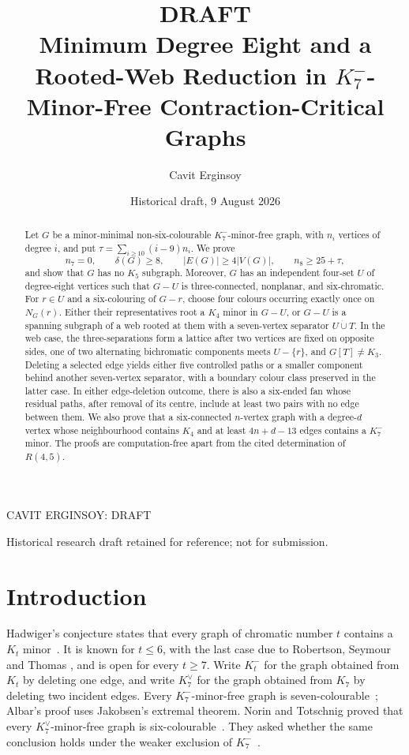 \documentclass[11pt]{amsart}
\title[DRAFT: Minimum Degree Eight and a Rooted-Web Reduction]
{\textbf{DRAFT}\\[0.5ex]
Minimum Degree Eight and a Rooted-Web Reduction in
$K_7^{-}$-Minor-Free Contraction-Critical Graphs}
\author{Cavit Erginsoy}
\date{Historical draft, 9 August 2026}
\begin{document}
\begin{abstract}
Let $G$ be a minor-minimal non-six-colourable $K_7^{-}$-minor-free graph,
with $n_i$ vertices of degree $i$, and put
$\tau=\sum_{i\geq10}(i-9)n_i$.  We prove
\[
 n_7=0,\qquad \delta(G)\geq8,\qquad |E(G)|\geq4|V(G)|,
 \qquad n_8\geq25+\tau,
\]
and show that $G$ has no $K_5$ subgraph.  Moreover, $G$ has an independent
four-set $U$ of degree-eight vertices such that $G-U$ is three-connected,
nonplanar, and six-chromatic.  For $r\in U$ and a six-colouring of $G-r$,
choose four colours occurring exactly once on $N_G(r)$.  Either their
representatives root a $K_4$ minor in $G-U$, or $G-U$ is a spanning subgraph
of a web rooted at them with a seven-vertex separator
$U\mathbin{\dot\cup}T$.  In the web case, the
three-separations form a lattice after two vertices are fixed on opposite
sides, one of two alternating bichromatic components meets $U-\{r\}$, and
$G[T]\ne K_3$.  Deleting a selected edge yields either five controlled paths
or a smaller component behind another seven-vertex separator, with a boundary
colour class preserved in the latter case.  In either edge-deletion outcome,
there is also a six-ended fan whose residual paths, after removal of its
centre, include at least two pairs with no edge between them.  We also prove that a
six-connected $n$-vertex graph with a degree-$d$ vertex whose neighbourhood
contains $K_4$ and at least $4n+d-13$ edges contains a $K_7^{-}$ minor.  The
proofs are computation-free apart from the cited determination of $R(4,5)$.
\end{abstract}

\maketitle
{}
{CAVIT ERGINSOY: DRAFT}

\begin{center}
\small Historical research draft retained for reference; not for submission.
\end{center}

\section{Introduction}

Hadwiger's conjecture states that every graph of chromatic number $t$
contains a $K_t$ minor~\cite{Hadwiger1943}.  It is known for $t\leq6$, with
the last case due to Robertson, Seymour and Thomas
\cite{RobertsonSeymourThomas1993}, and is open for every $t\geq7$.
Write $K_t^{-}$
for the graph obtained from $K_t$ by deleting one edge, and write
$K_7^{\vee}$ for the graph obtained from $K_7$ by deleting two incident
edges.  Every $K_7^{-}$-minor-free graph is
seven-colourable~\cite[Theorem~1]{Albar2014}; Albar's proof uses
Jakobsen's extremal theorem.  Norin and Totschnig proved
that every $K_7^{\vee}$-minor-free graph is
six-colourable~\cite[Theorem~4]{NorinTotschnig2025}.  They asked whether
the same conclusion holds under the weaker exclusion of
$K_7^{-}$~\cite[Conjecture~21]{NorinTotschnig2025}.
\end{document}
